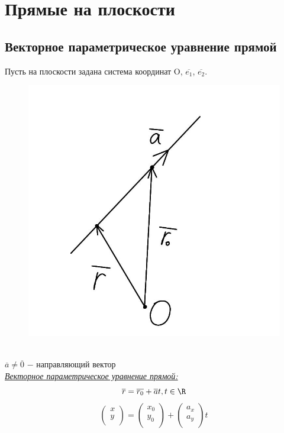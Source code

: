 \section{Прямые на плоскости}

\subsection{Векторное параметрическое уравнение прямой}

Пусть на плоскости задана система координат O, $\overline{e_1}$, $\overline{e_2}$.

\begin{figure}
	\includegraphics[width=0.84\linewidth]{images/1.1.jpeg}
\end{figure}

\tab\\
$\overline{a} \neq \overline{0}$ $-$ направляющий вектор\\

\underline{\textit{Векторное параметрическое уравнение прямой:}}
\[
\overline{r} = \overline{r_0} + \overline{a}t, t\in\R
\]
\[
\begin{pmatrix}
    x\\
    y\\
\end{pmatrix} = 
\begin{pmatrix}
    x_0\\
    y_0\\
\end{pmatrix} + 
\begin{pmatrix}
    a_x\\
    a_y\\
\end{pmatrix}t
\]
\tab\ \tab\\ \tab\\ \tab\\

